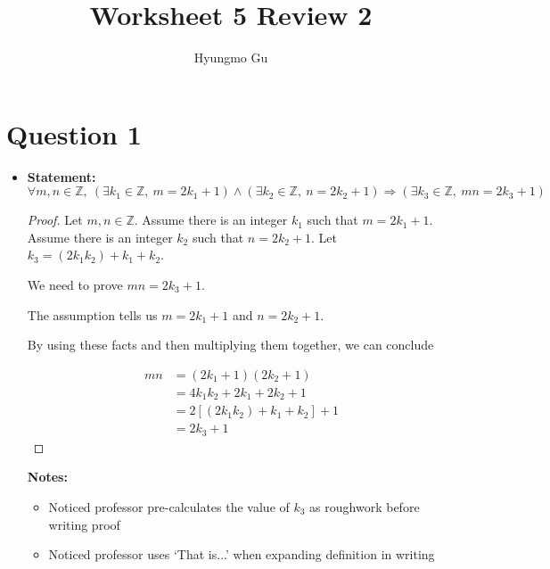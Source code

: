 \documentclass[12pt]{article}
\begin{document}
\title{Worksheet 5 Review 2}
\author{Hyungmo Gu}
\maketitle

\section*{Question 1}
\begin{itemize}

    \item

    \textbf{Statement:} $\forall m,n \in \mathbb{Z},\:(\exists k_1 \in \mathbb{Z},\:m=2k_1+1)
    \land (\exists k_2 \in \mathbb{Z},\:n = 2k_2 + 1) \Rightarrow (\exists k_3 \in \mathbb{Z},\:mn = 2k_3 + 1)$

    \begin{proof}

    Let $m,n \in \mathbb{Z}$. Assume there is an integer $k_1$ such that $m = 2k_1 + 1$.
    Assume there is an integer $k_2$ such that $n = 2k_2 + 1$. Let $k_3 = (2k_1k_2) + k_1 + k_2$.

    \bigskip

    We need to prove $mn = 2k_3 + 1$.

    \bigskip

    The assumption tells us $m = 2k_1 + 1$ and $n = 2k_2 + 1$.

    \bigskip

    By using these facts and then multiplying them together, we can conclude

    \begin{align}
        mn &= (2k_1 + 1)(2k_2 + 1)\\
        &= 4k_1k_2 + 2k_1 + 2k_2 + 1\\
        &= 2[(2k_1k_2) + k_1 + k_2] + 1\\
        &= 2k_3 + 1
    \end{align}

    \end{proof}

    \bigskip

    \textbf{Notes:}

    \begin{itemize}
        \item Noticed professor pre-calculates the value of $k_3$ as roughwork
        before writing proof
        \item Noticed professor uses `That is...' when expanding definition in writing


\end{itemize}
\end{itemize}
\end{document}
